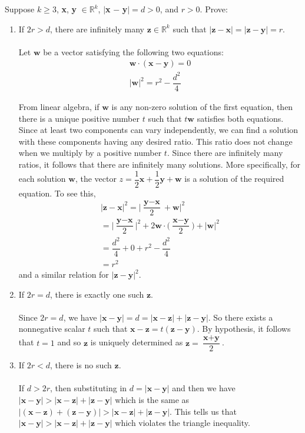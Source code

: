 \documentclass[12pt]{article}
\begin{document}
\problem Suppose $k \geq 3$, \textbf{x}, \textbf{y} $\in \mathbb{R}^{k}$, $| $\textbf{x} $-$ \textbf{y}$|= d > 0$, and $r>0$. Prove:
\begin{enumerate}
\item If $2r>d$, there are infinitely many $\textbf{z} \in \mathbb{R}^{k}$ such that $|\textbf{z}-\textbf{x}|=|\textbf{z}-\textbf{y}|=r$. \\ \\

Let $\textbf{w}$ be a vector satisfying the following two equations: \begin{align}
\textbf{w} \cdot (\textbf{x} - \textbf{y}) = 0 \\ 
|\textbf{w}|^{2} = r^{2} - \dfrac{d^{2}}{4}
\end{align} 

From linear algebra, if $\textbf{w}$ is any non-zero solution of the first equation, then there is a unique positive number $t$ such that $t\textbf{w}$ satisfies both equations. Since at least two components can vary independently, we can find a solution with these components having any desired ratio. This ratio does not change when we multiply by a positive number $t$. Since there are infinitely many ratios, it follows that there are infinitely many solutions. More specifically, for each solution $\textbf{w}$, the vector $z= \dfrac{1}{2}\textbf{x} + \dfrac{1}{2}\textbf{y} + \textbf{w}$ is a solution of the required equation. To see this,  
\begin{align*}
|\textbf{z}-\textbf{x}|^{2} = \bigg| \dfrac{\textbf{y}-\textbf{x}}{2} + \textbf{w} \bigg|^{2} \\
= \bigg| \dfrac{\textbf{y}-\textbf{x}}{2} \bigg|^{2} + 2\textbf{w} \cdot \bigg(\dfrac{\textbf{x}-\textbf{y}}{2} \bigg) + |\textbf{w}|^{2} \\
= \dfrac{d^{2}}{4} + 0 + r^{2} - \dfrac{d^{2}}{4} \\ 
= r^{2}
\end{align*}
and a similar relation for $|\textbf{z}-\textbf{y}|^{2}$.


\item If $2r=d$, there is exactly one such $\textbf{z}$. \\  \\ 

Since $2r=d$, we have $|\textbf{x}-\textbf{y}| = d = |\textbf{x}-\textbf{z}| + |\textbf{z}-\textbf{y}|$. So there exists a nonnegative scalar $t$ such that $\textbf{x}-\textbf{z} = t(\textbf{z}-\textbf{y}).$ By hypothesis, it follows that $t=1$ and so $\textbf{z}$ is uniquely determined as $\textbf{z} = \dfrac{\textbf{x}+\textbf{y}}{2}$. 

\item If $2r<d$, there is no such $\textbf{z}$. \\ \\
If $d>2r$, then substituting in $d=|\textbf{x}-\textbf{y}|$ and  then we have $|\textbf{x}-\textbf{y}| > |\textbf{x}-\textbf{z}| + |\textbf{z}-\textbf{y}|$ which is the same as  $|(\textbf{x}- \textbf{z})+(\textbf{z} - \textbf{y})| > |\textbf{x}-\textbf{z}| + |\textbf{z}-\textbf{y}|.$ This tells us that  $|\textbf{x}-\textbf{y}| > |\textbf{x}-\textbf{z}| + |\textbf{z}-\textbf{y}|$ which violates the triangle inequality. 
\end{enumerate}
\end{document}
